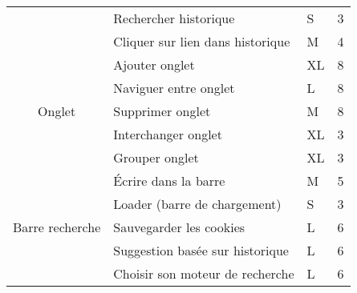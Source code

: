 \documentclass[10pt,a4paper]{article}
\begin{document}
\begin{table}[H]
\begin{tabular}{|c|l|l|l|}
                                        & Rechercher historique                        & S                                            & 3                                           \\ \cline{2-4} 
                                        & Cliquer sur lien dans historique             & M                                            & 4                                           \\ \hline
\multirow{5}{*}{Onglet}                 & Ajouter onglet                               & XL                                           & 8                                           \\ \cline{2-4} 
                                        & Naviguer entre onglet                        & L                                            & 8                                           \\ \cline{2-4} 
                                        & Supprimer onglet                             & M                                            & 8                                           \\ \cline{2-4} 
                                        & Interchanger onglet                          & XL                                           & 3                                           \\ \cline{2-4} 
                                        & Grouper onglet                               & XL                                           & 3                                           \\ \hline
\multirow{5}{*}{Barre recherche}        & Écrire dans la barre                         & M                                            & 5                                           \\ \cline{2-4} 
                                        & Loader (barre de chargement)                 & S                                            & 3                                           \\ \cline{2-4} 
                                        & Sauvegarder les cookies                      & L                                            & 6                                           \\ \cline{2-4} 
                                        & Suggestion basée sur historique              & L                                            & 6                                           \\ \cline{2-4} 
                                        & Choisir son moteur de recherche              & L                                            & 6                                           \\ \hline

\end{tabular}
\end{table}
\end{document}
